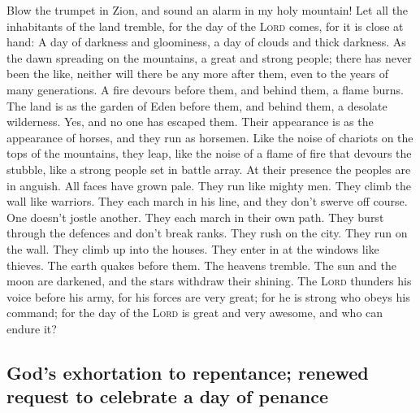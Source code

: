  Blow the trumpet in Zion, and sound an alarm in my holy
mountain! Let all the inhabitants of the land tremble, for the day of
the \textsc{Lord} comes, for it is close at hand:  A day
of darkness and gloominess, a day of clouds and thick darkness. As the
dawn spreading on the mountains, a great and strong people; there has
never been the like, neither will there be any more after them, even to
the years of many generations.  A fire devours before
them, and behind them, a flame burns. The land is as the garden of Eden
before them, and behind them, a desolate wilderness. Yes, and no one has
escaped them.  Their appearance is as the appearance of
horses, and they run as horsemen.  Like the noise of
chariots on the tops of the mountains, they leap, like the noise of a
flame of fire that devours the stubble, like a strong people set in
battle array.  At their presence the peoples are in
anguish. All faces have grown pale.  They run like mighty
men. They climb the wall like warriors. They each march in his line, and
they don't swerve off course.  One doesn't jostle another.
They each march in their own path. They burst through the defences and
don't break ranks.  They rush on the city. They run on the
wall. They climb up into the houses. They enter in at the windows like
thieves.  The earth quakes before them. The heavens
tremble. The sun and the moon are darkened, and the stars withdraw their
shining.  The \textsc{Lord} thunders his voice before his
army, for his forces are very great; for he is strong who obeys his
command; for the day of the \textsc{Lord} is great and very awesome, and
who can endure it?

\hypertarget{gods-exhortation-to-repentance-renewed-request-to-celebrate-a-day-of-penance}{%
\subsection{God's exhortation to repentance; renewed request to
celebrate a day of
penance}\label{gods-exhortation-to-repentance-renewed-request-to-celebrate-a-day-of-penance}}

